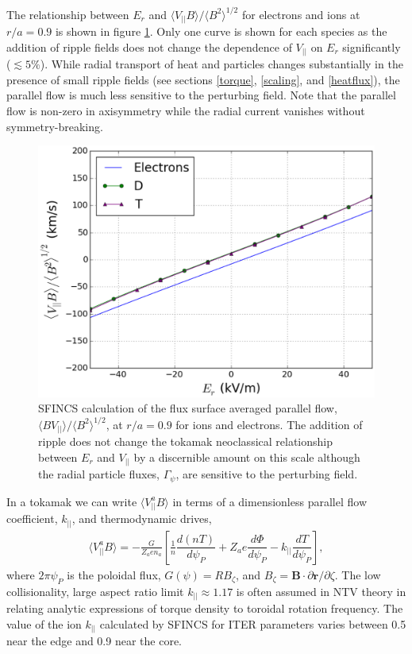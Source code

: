 \documentclass[aip, pop, preprint]{revtex4-1}
\numberwithin{figure}{section}
\numberwithin{equation}{section}
\newcommand{\der}[2]{\dfrac{d #1}{d  #2}}
\begin{document}
The relationship between $E_r$ and $\langle V_{||} B \rangle/\langle B^2 \rangle^{1/2}$ for electrons and ions at $r/a = 0.9$ is shown in figure \ref{fig:Er_flow}. Only one curve is shown for each species as the addition of ripple fields does not change the dependence of $V_{||}$ on $E_r$ significantly ($\lesssim 5 \%$). While radial transport of heat and particles changes substantially in the presence of small ripple fields (see sections \ref{torque}, \ref{scaling}, and \ref{heatflux}), the parallel flow is much less sensitive to the perturbing field. Note that the parallel flow is non-zero in axisymmetry while the radial current vanishes without symmetry-breaking. 

\begin{figure}[h!]
\centering
\includegraphics[width=.7\textwidth]{figure5.eps}
\caption{\label{fig:Er_flow} SFINCS calculation of the flux surface averaged parallel flow, $\langle B V_{||} \rangle/\langle B^2 \rangle^{1/2}$, at $r/a = 0.9$ for ions and electrons. The addition of ripple does not change the tokamak neoclassical relationship between $E_r$ and $V_{||}$ by a discernible amount on this scale although the radial particle fluxes, $\Gamma_{\psi}$, are sensitive to the perturbing field.}
\end{figure}

In a tokamak we can write $\langle V_{||}^a B \rangle$ in terms of a dimensionless parallel flow coefficient, $k_{||}$, and thermodynamic drives,
\begin{gather}
\langle  V_{||}^a  B\rangle = -\frac{G}{Z_a e n_a} \left[ \frac{1}{n} \der{(nT)}{\psi_P} + Z_a e \der{\Phi}{\psi_P} - k_{||} \der{T}{\psi_P} \right],
\end{gather}
where $2 \pi \psi_P$ is the poloidal flux, $G(\psi) = R B_{\zeta}$, and $B_{\zeta} = \bm{B} \cdot \partial \bm{r}/\partial \zeta$. The low collisionality, large aspect ratio limit \cite{Hinton1976, Hirshman1981} $k_{||} \approx 1.17$ is often assumed in NTV theory \cite{Callen2011, Sun2011} in relating analytic expressions of torque density to toroidal rotation frequency. The value of the ion $k_{||}$ calculated by SFINCS for ITER parameters varies between 0.5 near the edge and 0.9 near the core. 
\end{document}
